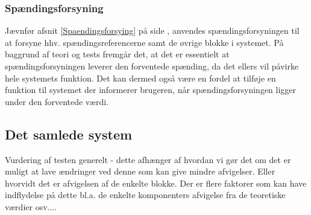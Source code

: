 \subsubsection{Spændingsforsyning}
Jævnfør afsnit \ref{Spaendingsforsying} på side \pageref{Spaendingsforsying}, anvendes spændingsforsyningen til at forsyne hhv. spændingsreferencerne samt de øvrige blokke i systemet. På baggrund af teori og tests fremgår det, at det er essentielt at spændingsforsyningen leverer den forventede spænding, da det ellers vil påvirke hele systemets funktion. Det kan dermed også være en fordel at tilføje en funktion til systemet der informerer brugeren, når spændingsforsyningen ligger under den forventede værdi. 

 
\subsection{Det samlede system}
Vurdering af testen generelt - dette afhænger af hvordan vi gør det om det er muligt at lave ændringer ved denne som kan give mindre afvigelser. Eller hvorvidt det er afvigelsen af de enkelte blokke. Der er flere faktorer som kan have indflydelse på dette bl.a. de enkelte komponenters afvigelse fra de teoretiske værdier osv....